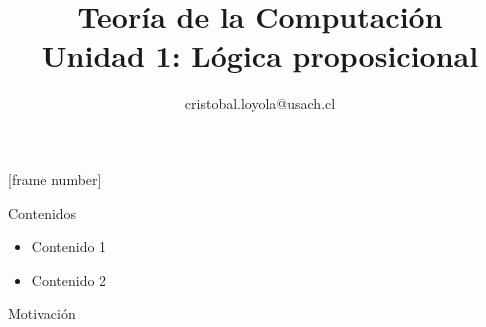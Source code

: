 \documentclass{beamer}
\begin{document}
\title[Lógica proposicional]{Teoría de la Computación \\ Unidad 1: Lógica
  proposicional} \author[Teoría de la Computación]{cristobal.loyola@usach.cl}
\date{}


\frame{\titlepage}

[frame number]

\begin{frame}{Contenidos}
  \begin{itemize}
    \item Contenido 1
    \item Contenido 2
  \end{itemize}
\end{frame}


\begin{frame}[plain,c]
  \vspace{1cm}
  \begin{center}
    \Huge Motivación
  \end{center}
\end{frame}
\end{document}
